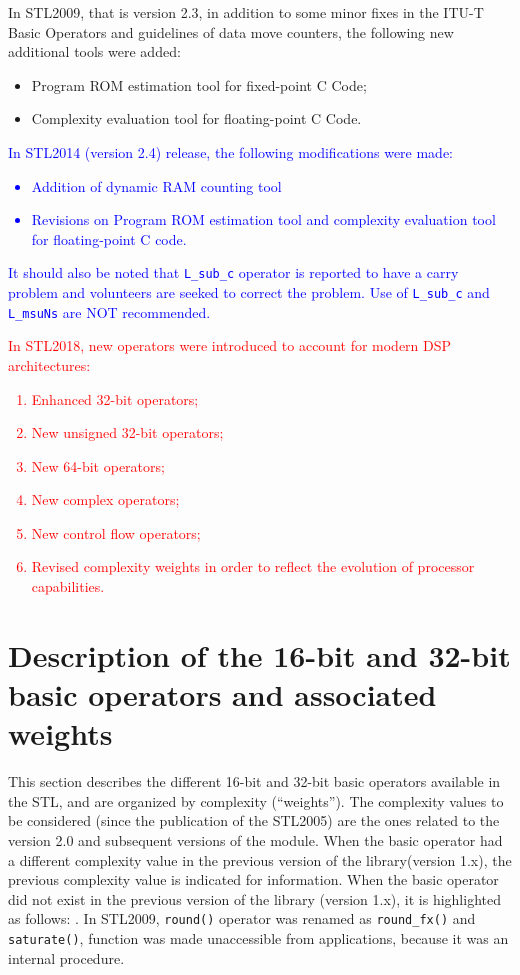 In STL2009, that is version 2.3, in addition to some minor fixes in the ITU-T Basic Operators and guidelines of data move counters, the following new additional tools were added:
\begin{itemize}
\item Program ROM estimation tool for fixed-point C Code;
\item Complexity evaluation tool for floating-point C Code.
\end{itemize}

\textcolor{blue}{
In STL2014 (version 2.4) release, the following modifications were made:
\begin{itemize}
\item Addition of dynamic RAM counting tool
\item Revisions on Program ROM estimation tool and complexity evaluation tool for floating-point C code.
\end{itemize}
It should also be noted that {\tt L\_sub\_c} operator is reported to have a carry problem and volunteers are seeked to correct the problem.
Use of {\tt L\_sub\_c} and {\tt L\_msuNs} are NOT recommended.
}

\textcolor{red}{
In STL2018, new operators were introduced to account for modern DSP architectures:
\begin{enumerate}
    \item Enhanced 32-bit operators;
    \item New unsigned 32-bit operators;
    \item New 64-bit operators;
    \item New complex operators;
    \item New control flow operators;
    \item Revised complexity weights in order to reflect the evolution of processor capabilities.
\end{enumerate}
}

\section{Description of the 16-bit and 32-bit basic operators and associated weights}

This section describes the different 16-bit and 32-bit basic operators available in the STL, and are organized by complexity (``weights'').
The complexity values to be considered (since the publication of the STL2005) are the ones related to the version 2.0 and subsequent versions of the module.
When the basic operator had a different complexity value in the previous version of the library(version 1.x), the previous complexity value is indicated for information.
When the basic operator did not exist in the previous version of the library (version 1.x), it is highlighted as follows:
 . In STL2009, {\tt round()} operator was renamed as {\tt round\_fx()} and {\tt saturate()}, function was made unaccessible from applications, because it was an internal procedure.

